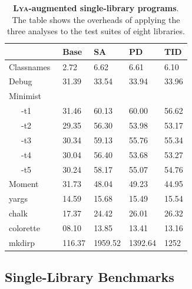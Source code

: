 \documentclass[letterpaper,twocolumn,10pt]{article}
\newcommand{\sys}{{\scshape Lya}\xspace}
\begin{document}
\begin{table}[t]
\center
\footnotesize
\setlength\tabcolsep{3pt}
\caption{
  \footnotesize{
    \textbf{\sys-augmented single-library programs}.
    The table shows the overheads of applying the three analyses to the test suites of eight libraries. %
  }
}
\begin{tabular*}{\columnwidth}{l @{\extracolsep{\fill}} lll l}
\toprule
                               & Base   &  SA   & PD     &   TID   \\
\midrule
Classnames~\cite{classnames}   &  2.72  & 6.62  &  6.61  &  6.10   \\
Debug~\cite{debug}             & 31.39  & 33.54 &  33.94 &  33.96  \\
Minimist~\cite{minimist}       &        &       &        &         \\
~~~-t1                         & 31.46  & 60.13 &  60.00 &  56.62  \\
~~~-t2                         & 29.35  & 56.30 &  53.98 &  53.17  \\
~~~-t3                         & 30.34  & 59.13 &  55.76 &  55.34  \\
~~~-t4                         & 30.04  & 56.40 &  53.68 &  53.27  \\
~~~-t5                         & 30.24  & 58.17 &  55.07 &  54.76  \\
Moment~\cite{moment}           & 31.73  & 48.04 &  49.23 &  44.95  \\
yargs~\cite{yargs}             & 14.59  & 15.68 &  15.49 &  15.54  \\
chalk~\cite{chalk}             & 17.37  & 24.42 &  26.01 &  26.32  \\
colorette~\cite{colorette}     & 08.10  & 13.85 &  13.41 &  13.16  \\
mkdirp~\cite{mkdirp}           & 116.37 & 1959.52 & 1392.64 & 1252 \\
\bottomrule
\end{tabular*}
\label{tab:meso}
\vspace{-5mm}
\end{table}



\subsection{Single-Library Benchmarks}
\label{meso}
\end{document}
